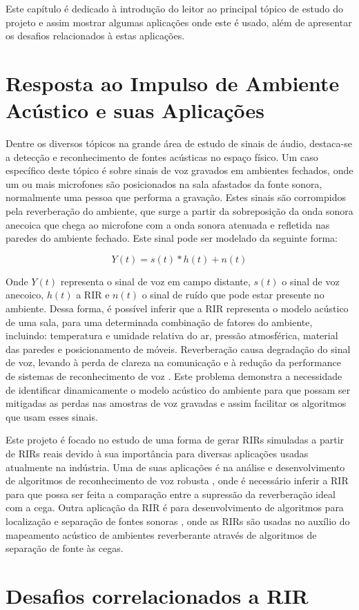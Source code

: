 Este capítulo é dedicado à introdução do leitor ao principal tópico de estudo do projeto e assim mostrar
algumas aplicações onde este é usado, além de apresentar os desafios relacionados à estas aplicações.

\section{Resposta ao Impulso de Ambiente Acústico e suas Aplicações}

Dentre os diversos tópicos na grande área de estudo de sinais de áudio, destaca-se a detecção e reconhecimento de fontes acústicas no espaço físico.
Um caso específico deste tópico é sobre sinais de voz gravados em ambientes fechados, onde um ou mais microfones são posicionados na sala afastados
da fonte sonora, normalmente uma pessoa que performa a gravação.
Estes sinais são corrompidos pela reverberação do ambiente, que surge a partir da sobreposição da onda sonora anecoica que chega ao microfone com a 
onda sonora atenuada e refletida nas paredes do ambiente fechado.
Este sinal pode ser modelado da seguinte forma:

\begin{equation}
    Y(t) = s(t) \ast h(t) + n(t)
\end{equation}


Onde $Y(t)$ representa o sinal de voz em campo distante, $s(t)$ o sinal de voz anecoico, $h(t)$ a RIR e $n(t)$ o sinal de ruído que pode
estar presente no ambiente.
Dessa forma, é possível inferir que a RIR representa o modelo acústico de uma sala, para uma determinada combinação de fatores do ambiente, incluindo: 
temperatura e umidade relativa do ar, pressão atmosférica, material das paredes e posicionamento de móveis.
Reverberação causa degradação do sinal de voz, levando à perda de clareza na comunicação \cite{Speech_intellig_hear} e à redução da performance
de sistemas de reconhecimento de voz \cite{reverb_sup_speech_reg}. Este problema demonstra a necessidade de identificar dinamicamente o modelo acústico
do ambiente para que possam ser mitigadas as perdas nas amostras de voz gravadas e assim facilitar os algoritmos que usam esses sinais.

Este projeto é focado no estudo de uma forma de gerar RIRs simuladas a partir de RIRs reais devido à sua importância para diversas
aplicações usadas atualmente na indústria. Uma de suas aplicações é na análise e desenvolvimento de algoritmos de 
reconhecimento de voz robusta \cite{reverb_sup_speech_reg}, onde é necessário inferir a RIR para que possa ser feita a comparação entre
a supressão da reverberação ideal com a cega.
Outra aplicação da RIR é para desenvolvimento de algoritmos para localização e separação de fontes sonoras \cite{Source_sep_RIR},
onde as RIRs são usadas no auxílio do mapeamento acústico de ambientes reverberante através de algoritmos de separação de fonte às cegas.

\section{Desafios correlacionados a RIR}

